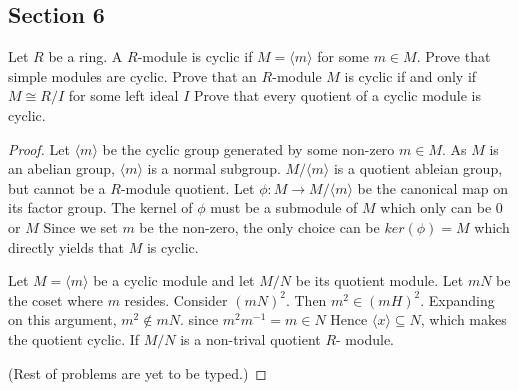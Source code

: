 \documentclass[Aluffi.tex]{subfiles}
\begin{document}
\subsection{Section 6}

\begin{problem}
Let $R$ be a ring. A $R$-module is cyclic if $M = \langle m \rangle$ for some $m \in M$. Prove that simple modules are cyclic. Prove that an $R$-module $M$ is cyclic if and only if $M \cong R/I$ for some left ideal $I$ Prove that every quotient of a cyclic module is cyclic. 
\end{problem}

\begin{proof}
Let $\langle m \rangle$ be the cyclic group generated by some non-zero $m \in M$. As $M$ is an abelian group, $\langle m \rangle$ is a normal subgroup. $M / \langle m \rangle$ is a quotient ableian group, but cannot be a $R$-module quotient. Let $\phi: M \rightarrow M / {\langle m \rangle}$ be the canonical map on its factor group.
The kernel of $\phi$ must be a submodule of $M$ which only can be $0$ or $M$ Since we set $m$ be the non-zero, the only choice can be $ker(\phi) = M$ which directly yields that $M$ is cyclic. \par
Let $M = \langle m \rangle$ be a cyclic module and let $M/N$ be its quotient module. Let $mN$ be the coset where $m$ resides. Consider $(mN)^2$. Then $m^2 \in (mH)^2$.  Expanding on this argument, $m^2 \not\in mN$. 
since $m^2m^{-1} = m \in N$ Hence $\langle x \rangle \subseteq N$, which makes the quotient cyclic.
If $M/N$ is a non-trival quotient $R$- module.  

(Rest of problems are yet to be typed.) 
\end{proof}
\end{document}
